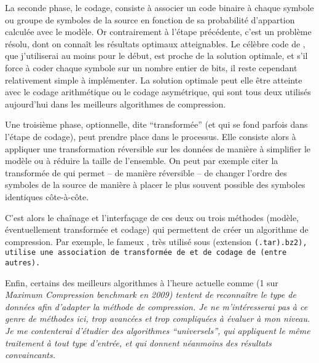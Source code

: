 \documentclass[a4paper, 11pt]{article}
\begin{document}
\vspace{0.2cm}

La seconde phase, le codage, consiste à associer un code binaire à chaque symbole ou groupe de symboles de la source en fonction de sa probabilité d'appartion calculée avec le modèle. Or contrairement à l'étape précédente, c'est un problème résolu, dont on connaît les résultats optimaux atteignables. Le célèbre code de , que j'utiliserai au moins pour le début, est proche de la solution optimale, et s'il force à coder chaque symbole sur un nombre entier de bits, il reste cependant relativement simple à implémenter. La solution optimale peut elle être atteinte avec le codage arithmétique ou le codage asymétrique, qui sont tous deux utilisés aujourd'hui dans les meilleurs algorithmes de compression.

\vspace{0.2cm}

Une troisième phase, optionnelle, dite ``transformée'' (et qui se fond parfois dans l'étape de codage), peut prendre place dans le processus. Elle consiste alors à appliquer une transformation réversible sur les données de manière à simplifier le modèle ou à réduire la taille de l'ensemble. On peut par exemple citer la transformée de  qui permet -- de manière réversible -- de changer l'ordre des symboles de la source de manière à placer le plus souvent possible des symboles identiques côte-à-côte.

\vspace{0.2cm}

C'est alors le chaînage et l'interfaçage de ces deux ou trois méthodes (modèle, éventuellement transformée et codage) qui permettent de créer un algorithme de compression. Par exemple, le fameux , très utilisé sous  (extension \tt{\rm{(}.tar\rm{)}.bz2}), utilise une association de transformée de  et de codage de  (entre autres).

\vspace{0.2cm}

Enfin, certains des meilleurs algorithmes à l'heure actuelle comme  (1 sur \it{Maximum Compression benchmark} en 2009) tentent de reconnaître le type de données afin d'adapter la méthode de compression. Je ne m'intéresserai pas à ce genre de méthodes ici, trop avancées et trop compliquées à évaluer à mon niveau. Je me contenterai d'étudier des algorithmes ``universels'', qui appliquent le même traitement à tout type d'entrée, et qui donnent néanmoins des résultats convaincants.
\end{document}
